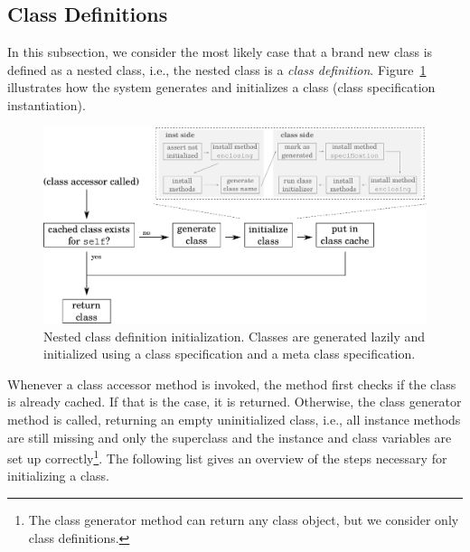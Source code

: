 \subsection{Class Definitions}
In this subsection, we consider the most likely case that a brand new class is defined as a nested class, i.e., the nested class is a \emph{class definition}. Figure~\ref{fig:lazy_class_gen} illustrates how the system generates and initializes a class (class specification instantiation). 

\begin{figure}[!hbp]
	\includegraphics[width=\textwidth]{lazy_class_gen.pdf}
	\centering
	\caption[Nested class definition initialization]{Nested class definition initialization. Classes are generated lazily and initialized using a class specification and a meta class specification.}
	\label{fig:lazy_class_gen}
\end{figure}

Whenever a class accessor method is invoked, the method first checks if the class is already cached. If that is the case, it is returned. Otherwise, the class generator method is called, returning an empty uninitialized class, i.e., all instance methods are still missing and only the superclass and the instance and class variables are set up correctly\footnote{The class generator method can return any class object, but we consider only class definitions.}. The following list gives an overview of the steps necessary for initializing a class.

